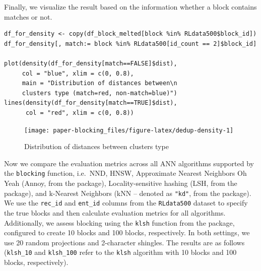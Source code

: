 Finally, we visualize the result based on the information whether a block contains matches or not.

\begin{verbatim}
df_for_density <- copy(df_block_melted[block %in% RLdata500$block_id])
df_for_density[, match:= block %in% RLdata500[id_count == 2]$block_id]

plot(density(df_for_density[match==FALSE]$dist),
     col = "blue", xlim = c(0, 0.8), 
     main = "Distribution of distances between\n
     clusters type (match=red, non-match=blue)")
lines(density(df_for_density[match==TRUE]$dist),
      col = "red", xlim = c(0, 0.8))
\end{verbatim}

\begin{figure}[H]

{\centering \texttt{[image: paper-blocking\_files/figure-latex/dedup-density-1]} 

}

\caption{Distribution of distances between clusters type}\label{fig:dedup-density}
\end{figure}

Now we compare the evaluation metrics across all ANN algorithms supported by the \texttt{blocking} function, i.e.~NND, HNSW, Approximate Nearest Neighbors Oh Yeah (Annoy, from the  package), Locality-sensitive hashing (LSH, from the  package), and k-Nearest Neighbors (kNN -- denoted as \texttt{"kd"}, from the  package). We use the \texttt{rec\_id} and \texttt{ent\_id} columns from the \texttt{RLdata500} dataset to specify the true blocks and then calculate evaluation metrics for all algorithms. Additionally, we assess blocking using the \texttt{klsh} function from the  package, configured to create 10 blocks and 100 blocks, respectively. In both settings, we use 20 random projections and 2-character shingles. The results are as follows (\texttt{klsh\_10} and \texttt{klsh\_100} refer to the \texttt{klsh} algorithm with 10 blocks and 100 blocks, respectively).

